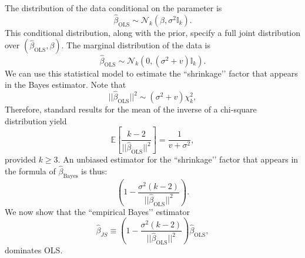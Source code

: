 \documentclass[11pt]{article} %
\begin{document}
The distribution of the data conditional on the parameter is 
\[ \widehat{\beta}_{\textrm{OLS}} \sim \mathcal{N}_{k}(\beta, \sigma^2 \mathbb{I}_k).  \]
This conditional distribution, along with the prior, specify a full joint distribution over $(\widehat{\beta}_{\textrm{OLS}}, \beta)$. The marginal distribution of the data is 
\[\widehat{\beta}_{\textrm{OLS}} \sim \mathcal{N}_{k}\left ( 0 , (\sigma^2  + v)  \mathbb{I}_k  \right). \]
We can use this statistical model to estimate the ``shrinkage’’ factor that appears in the Bayes estimator. Note that
\[ ||\widehat{\beta}_{\textrm{OLS}} ||^2 \sim (\sigma^2 + v) \chi^2_{k}, \]
Therefore, standard results for the mean of the inverse of a chi-square distribution yield
\[\mathbb{E} \left[ \frac{k-2 }{||\widehat{\beta}_{\textrm{OLS}} ||^2} \right] = \frac{1}{v+\sigma^2}, \]
provided $k \geq 3$. An unbiased estimator for the ``shrinkage’’ factor that appears in the formula of $\widehat{\beta}_{\textrm{Bayes}}$ is thus:
\[\left(1 -  \frac{\sigma^2 (k-2)}{||\widehat{\beta}_{\textrm{OLS}} ||^2} \right). \]
We now show that the ``empirical Bayes’’ estimator 
\[\widehat{\beta}_{JS} \equiv \left(1 -  \frac{\sigma^2 (k-2)}{||\widehat{\beta}_{\textrm{OLS}} ||^2} \right) \widehat{\beta}_{\textrm{OLS}}, \]
dominates OLS. 
\end{document}
